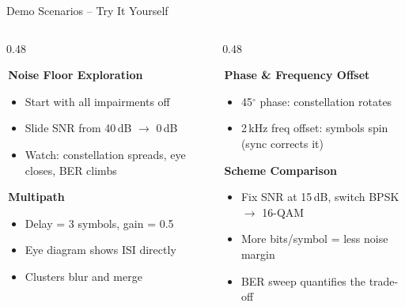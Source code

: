 \documentclass[aspectratio=169, 12pt]{beamer}
\newcommand{\hlbox}[2]{%
  \colorbox{#1}{\strut\color{white}\bfseries\,#2\,}%
}
\begin{document}
\begin{frame}{Demo Scenarios -- Try It Yourself}
\begin{columns}[T]
\begin{column}{0.48\textwidth}
\hlbox{green!50}{Noise Floor Exploration}
\begin{itemize}
    \item Start with all impairments off
    \item Slide SNR from 40\,dB $\to$ 0\,dB
    \item Watch: constellation spreads, eye closes, BER climbs
\end{itemize}
\vspace{0.3cm}
\hlbox{purple!60}{Multipath}
\begin{itemize}
    \item Delay = 3 symbols, gain = 0.5
    \item Eye diagram shows ISI directly
    \item Clusters blur and merge
\end{itemize}
\end{column}
\begin{column}{0.48\textwidth}
\hlbox{orange!60}{Phase \& Frequency Offset}
\begin{itemize}
    \item 45$^\circ$ phase: constellation rotates
    \item 2\,kHz freq offset: symbols spin (sync corrects it)
\end{itemize}
\vspace{0.3cm}
\hlbox{cyan!50}{Scheme Comparison}
\begin{itemize}
    \item Fix SNR at 15\,dB, switch BPSK $\to$ 16-QAM
    \item More bits/symbol = less noise margin
    \item BER sweep quantifies the trade-off
\end{itemize}
\end{column}
\end{columns}
\end{frame}
\end{document}
